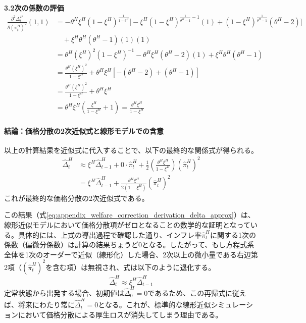\textbf{3.2次の係数の評価}
\begin{align}
    \frac{\partial^2\Delta_t^H}{\partial(\pi_t^H)^2}(1,1)&=-\theta^H\xi^H(1-\xi^H)^{\frac{1}{1-\theta^H}}\Bigg[-\xi^H(1-\xi^H)^{\frac{1}{\theta^H-1}-1}(1)+(1-\xi^H)^{\frac{1}{\theta^H-1}}(\theta^H-2)\Bigg] \label{eq:appendix_welfare_correction_derivation_eval_pi_second_step1} \\
    &\quad+\xi^H\theta^H(\theta^H-1)(1)(1) \label{eq:appendix_welfare_correction_derivation_eval_pi_second_step2} \\
    &=\theta^H(\xi^H)^2(1-\xi^H)^{-1}-\theta^H\xi^H(\theta^H-2)(1)+\xi^H\theta^H(\theta^H-1) \label{eq:appendix_welfare_correction_derivation_eval_pi_second_step3} \\
    &=\frac{\theta^H(\xi^H)^2}{1-\xi^H}+\theta^H\xi^H\left[-(\theta^H-2)+(\theta^H-1)\right] \label{eq:appendix_welfare_correction_derivation_eval_pi_second_step4} \\
    &=\frac{\theta^H(\xi^H)^2}{1-\xi^H}+\theta^H\xi^H \label{eq:appendix_welfare_correction_derivation_eval_pi_second_step5} \\
    &=\theta^H\xi^H\left(\frac{\xi^H}{1-\xi^H}+1\right)=\frac{\theta^H\xi^H}{1-\xi^H}
\label{eq:appendix_welfare_correction_derivation_eval_pi_second}
\end{align}

\paragraph{結論：価格分散の2次近似式と線形モデルでの含意}\label{sec:appendix_welfare_correction_derivation_conclusion_p1}

以上の計算結果を近似式に代入することで、以下の最終的な関係式が得られる。
\begin{align}
    \hat{\Delta}_t^H&\approx\xi^H\hat{\Delta}_{t-1}^H+0\cdot\hat{\pi}_t^H+\frac{1}{2}\left(\frac{\theta^H\xi^H}{1-\xi^H}\right)(\hat{\pi}_t^H)^2 \label{eq:appendix_welfare_correction_derivation_delta_approx_step} \\
    &=\xi^H\hat{\Delta}_{t-1}^H+\frac{\theta^H\xi^H}{2(1-\xi^H)}(\hat{\pi}_t^H)^2
\label{eq:appendix_welfare_correction_derivation_delta_approx}
\end{align}
これが最終的な価格分散の2次近似式である。

この結果（式\ref{eq:appendix_welfare_correction_derivation_delta_approx}）は、線形近似モデルにおいて価格分散項がゼロとなることの数学的な証明となっている。具体的には、上式の導出過程で確認した通り、インフレ率\(\hat{\pi}_t^H\)に関する1次の係数（偏微分係数）は計算の結果ちょうど0となる。したがって、もし方程式系全体を1次のオーダーで近似（線形化）した場合、2次以上の微小量である右辺第2項（\((\hat{\pi}_t^H)^2\)を含む項）は無視され、式は以下のように退化する。
\begin{equation}
    \hat{\Delta}_t^H\approx\xi^H\hat{\Delta}_{t-1}^H
\label{eq:appendix_welfare_correction_derivation_delta_degenerated}
\end{equation}
定常状態から出発する場合、初期値は\(\hat{\Delta}_0^H=0\)であるため、この再帰式に従えば、将来にわたり常に\(\hat{\Delta}_t^H=0\)となる。これが、標準的な線形近似シミュレーションにおいて価格分散による厚生ロスが消失してしまう理由である。

